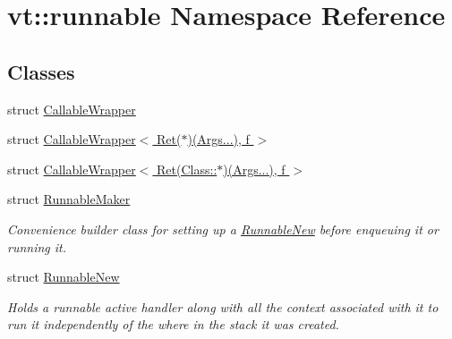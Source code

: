 \hypertarget{namespacevt_1_1runnable}{}\section{vt\+:\+:runnable Namespace Reference}
\label{namespacevt_1_1runnable}
\subsection*{Classes}
\begin{DoxyCompactItemize}
\item 
struct \hyperlink{structvt_1_1runnable_1_1_callable_wrapper}{Callable\+Wrapper}
\item 
struct \hyperlink{structvt_1_1runnable_1_1_callable_wrapper_3_01_ret_07_5_08_07_args_8_8_8_08_00_01f_01_4}{Callable\+Wrapper$<$ Ret($\ast$)(\+Args...), f $>$}
\item 
struct \hyperlink{structvt_1_1runnable_1_1_callable_wrapper_3_01_ret_07_class_1_1_5_08_07_args_8_8_8_08_00_01f_01_4}{Callable\+Wrapper$<$ Ret(\+Class\+::$\ast$)(\+Args...), f $>$}
\item 
struct \hyperlink{structvt_1_1runnable_1_1_runnable_maker}{Runnable\+Maker}
\begin{DoxyCompactList}\small\item\em Convenience builder class for setting up a {\ttfamily \hyperlink{structvt_1_1runnable_1_1_runnable_new}{Runnable\+New}} before enqueuing it or running it. \end{DoxyCompactList}\item 
struct \hyperlink{structvt_1_1runnable_1_1_runnable_new}{Runnable\+New}
\begin{DoxyCompactList}\small\item\em Holds a runnable active handler along with all the context associated with it to run it independently of the where in the stack it was created. \end{DoxyCompactList}\end{DoxyCompactItemize}
